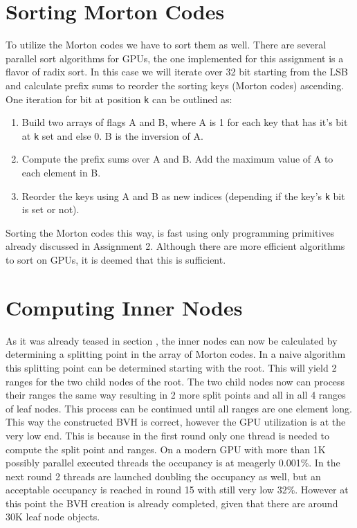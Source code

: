 \documentclass[letterpaper, 10 pt, conference]{IEEEconf}  %
\begin{document}
\section{Sorting Morton Codes}
\label{sortmortoncodes}

To utilize the Morton codes we have to sort them as well. There are several parallel sort algorithms for GPUs, the one implemented for this assignment is a flavor of radix sort. In this case we will iterate over 32 bit starting from the LSB and calculate prefix sums to reorder the sorting keys (Morton codes) ascending. One iteration for bit at position \texttt{k} can be outlined as:
\begin{enumerate}
  \item Build two arrays of flags A and B, where A is 1 for each key that has it's bit at \texttt{k} set and else 0. B is the inversion of A.
  \item Compute the prefix sums over A and B. Add the maximum value of A to each element in B.
  \item Reorder the keys using A and B as new indices (depending if the key's \texttt{k} bit is set or not).
\end{enumerate}

Sorting the Morton codes this way, is fast using only programming primitives already discussed in Assignment 2. Although there are more efficient algorithms to sort on GPUs, it is deemed that this is sufficient.

\section{Computing Inner Nodes}
\label{computeinnernodes}

As it was already teased in section , the inner nodes can now be calculated by determining a splitting point in the array of Morton codes. In a naive algorithm this splitting point can be determined starting with the root. This will yield 2 ranges for the two child nodes of the root. The two child nodes now can process their ranges the same way resulting in 2 more split points and all in all 4 ranges of leaf nodes. This process can be continued until all ranges are one element long. This way the constructed BVH is correct, however the GPU utilization is at the very low end. This is because in the first round only one thread is needed to compute the split point and ranges. On a modern GPU with more than 1K possibly parallel executed threads the occupancy is at meagerly 0.001\%. In the next round 2 threads are launched doubling the occupancy as well, but an acceptable occupancy is reached in round 15 with still very low 32\%. However at this point the BVH creation is already completed, given that there are around 30K leaf node objects.
\end{document}
